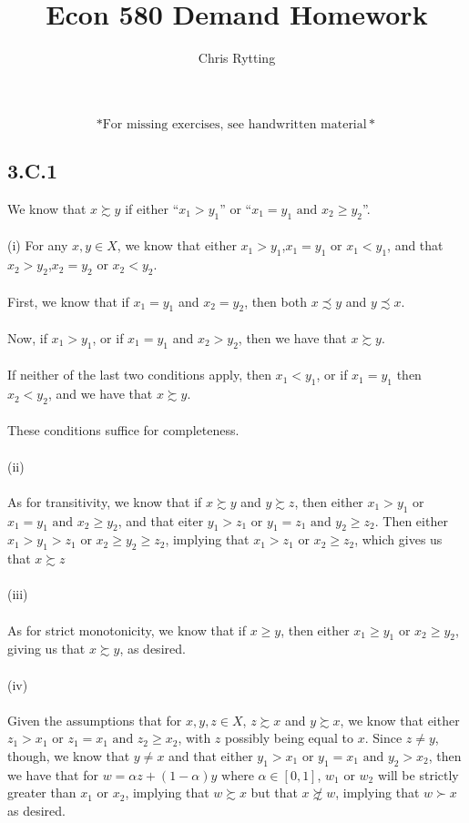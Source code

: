 \documentclass[letterpaper,12pt]{article}
\theoremstyle{definition}
\begin{document}
\title{Econ 580 Demand Homework}
\author{Chris Rytting}
\maketitle

\[*\text{For missing exercises, see handwritten material}*\]
\subsection*{3.C.1}
We know that  $x \succsim y$ if either ``$x_1 > y_1$'' or ``$x_1 = y_1 \text{ and } x_2 \geq y_2$''.\\\\
(i) For any $x,y \in  X$, we know that either $x_1 > y_1$,$x_1 = y_1$ or $x_1 < y_1$, and that $x_2 > y_2$,$x_2 = y_2$ or $x_2 < y_2$. \\\\
First, we know that if $x_1 = y_1$ and $x_2 = y_2$, then both $x \precsim y$ and $y \precsim x$.\\\\
Now, if $x_1 > y_1$, or if $x_1 = y_1$ and $x_2 > y_2$, then we have that $x \succsim y$.\\\\
If neither of the last two conditions apply, then $x_1 < y_1$, or if $x_1 = y_1$ then $x_2 < y_2$, and we have that $x \succsim y$.\\\\
These conditions suffice for completeness.\\\\

(ii) \\\\
As for transitivity, we know that if $x \succsim y$ and $y \succsim z$, then either $x_1 > y_1$ or $x_1 = y_1 \text{ and } x_2 \geq y_2$, and that eiter $y_1 > z_1$ or $y_1 = z_1 \text{ and } y_2 \geq z_2$. Then either $x_1 > y_1 > z_1$ or $x_2 \geq y_2 \geq z_2$, implying that $x_1 > z_1$ or $x_2 \geq z_2$, which gives us that $x \succsim z$\\\\

(iii)\\\\

As for strict monotonicity, we know that if $x \geq y$, then either $x_1 \geq y_1$ or $x_2 \geq y_2$, giving us that $x \succsim y$, as desired.\\\\
(iv)\\\\
Given the assumptions that for $x,y,z \in X$, $z \succsim x$ and $y \succsim x$, we know that either $z_1 > x_1$ or $z_1 = x_1 \text{ and } z_2 \geq x_2$, with $z$ possibly being equal to $x$. Since $z \neq y$, though, we know that $y \neq x$ and that either $y_1 > x_1$ or $y_1 = x_1 \text{ and } y_2 > x_2$, then we have that for $w = \alpha z + (1-\alpha) y \text{ where } \alpha \in [0,1]$, $w_1$ or $w_2$ will be strictly greater than $x_1$ or $x_2$, implying that $w \succsim x$ but that $x \not \succsim w$, implying that $w \succ x$ as desired.
\end{document}
